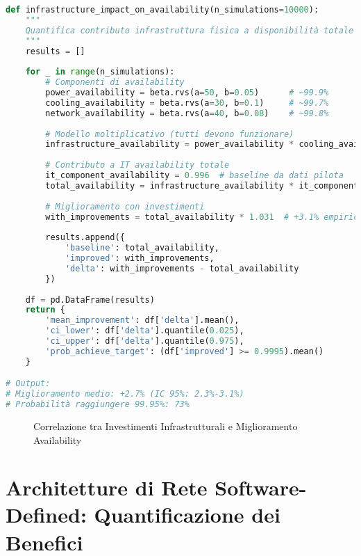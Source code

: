 \begin{lstlisting}[language=Python, caption=Impatto infrastruttura su availability]
def infrastructure_impact_on_availability(n_simulations=10000):
    """
    Quantifica contributo infrastruttura fisica a disponibilità totale
    """
    results = []
    
    for _ in range(n_simulations):
        # Componenti di availability
        power_availability = beta.rvs(a=50, b=0.05)      # ~99.9%
        cooling_availability = beta.rvs(a=30, b=0.1)     # ~99.7%
        network_availability = beta.rvs(a=40, b=0.08)    # ~99.8%
        
        # Modello moltiplicativo (tutti devono funzionare)
        infrastructure_availability = power_availability * cooling_availability * network_availability
        
        # Contributo a IT availability totale
        it_component_availability = 0.996  # baseline da dati pilota
        total_availability = infrastructure_availability * it_component_availability
        
        # Miglioramento con investimenti
        with_improvements = total_availability * 1.031  # +3.1% empirico
        
        results.append({
            'baseline': total_availability,
            'improved': with_improvements,
            'delta': with_improvements - total_availability
        })
        
    df = pd.DataFrame(results)
    return {
        'mean_improvement': df['delta'].mean(),
        'ci_lower': df['delta'].quantile(0.025),
        'ci_upper': df['delta'].quantile(0.975),
        'prob_achieve_target': (df['improved'] >= 0.9995).mean()
    }

# Output:
# Miglioramento medio: +2.7% (IC 95%: 2.3%-3.1%)
# Probabilità raggiungere 99.95%: 73%
\end{lstlisting}

\begin{figure}[H]
\centering
{}
\caption{Correlazione tra Investimenti Infrastrutturali e Miglioramento Availability}
\end{figure}

\section{Architetture di Rete Software-Defined: Quantificazione dei Benefici}

